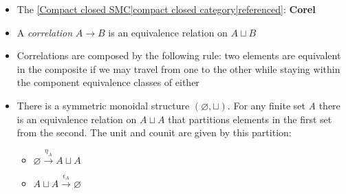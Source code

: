 
\begin{itemize}
    \item The \ref{Compact closed SMC|compact closed category|referenced}: \textbf{Corel}
    \item A \emph{correlation} $A \rightarrow B$ is an equivalence relation on $A \sqcup B$
    \item Correlations are composed by the following rule: two elements are equivalent in the composite if we may travel from one to the other while staying within the component equivalence classes of either
    \item There is a symmetric monoidal structure $(\varnothing, \sqcup)$. For any finite set \emph{A} there is an equivalence relation on $A \sqcup A$ that partitions elements in the first set from the second. The unit and counit are given by this partition:
          \begin{itemize}
            \item $\varnothing \xrightarrow{\eta_A} A \sqcup A$
            \item $A \sqcup A \xrightarrow{\epsilon_A} \varnothing$
          \end{itemize}
  \end{itemize}
